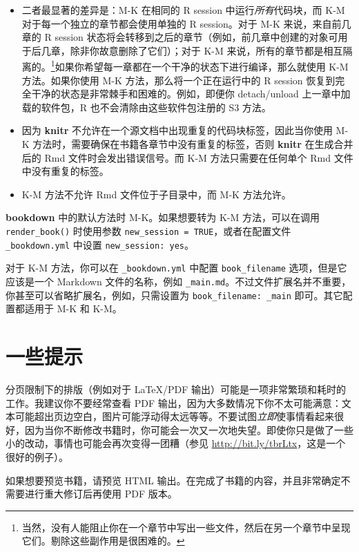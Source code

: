 \documentclass[
  12pt,
]{krantz}
\providecommand{\tightlist}{%
  \setlength{\itemsep}{0pt}\setlength{\parskip}{0pt}}
\theoremstyle{definition}
\theoremstyle{definition}
\theoremstyle{definition}
\theoremstyle{definition}
\theoremstyle{remark}
\begin{document}
\begin{itemize}
\tightlist
\item
  二者最显著的差异是：M-K 在相同的 R session 中运行\emph{所有}代码块，而 K-M 对于每一个独立的章节都会使用单独的 R session。对于 M-K 来说，来自前几章的 R session 状态将会转移到之后的章节（例如，前几章中创建的对象可用于后几章，除非你故意删除了它们）；对于 K-M 来说，所有的章节都是相互隔离的。\footnote{当然，没有人能阻止你在一个章节中写出一些文件，然后在另一个章节中呈现它们。剔除这些副作用是很困难的。}如果你希望每一章都在一个干净的状态下进行编译，那么就使用 K-M 方法。如果你使用 M-K 方法，那么将一个正在运行中的 R session 恢复到完全干净的状态是非常棘手和困难的。例如，即便你 detach/unload 上一章中加载的软件包，R 也不会清除由这些软件包注册的 S3 方法。
\item
  因为 \textbf{knitr} 不允许在一个源文档中出现重复的代码块标签，因此当你使用 M-K 方法时，需要确保在书籍各章节中没有重复的标签，否则 \textbf{knitr} 在生成合并后的 Rmd 文件时会发出错误信号。而 K-M 方法只需要在任何单个 Rmd 文件中没有重复的标签。
\item
  K-M 方法不允许 Rmd 文件位于子目录中，而 M-K 方法允许。
\end{itemize}

\textbf{bookdown} 中的默认方法时 M-K。如果想要转为 K-M 方法，可以在调用 \texttt{render\_book()} 时使用参数 \texttt{new\_session\ =\ TRUE}，或者在配置文件 \texttt{\_bookdown.yml} 中设置 \texttt{new\_session:\ yes}。

对于 K-M 方法，你可以在 \texttt{\_bookdown.yml} 中配置 \texttt{book\_filename} 选项，但是它应该是一个 Markdown 文件的名称，例如 \texttt{\_main.md}。不过文件扩展名并不重要，你甚至可以省略扩展名，例如，只需设置为 \texttt{book\_filename:\ \_main} 即可。其它配置都适用于 M-K 和 K-M。

\section{一些提示}\label{ux4e00ux4e9bux63d0ux793a}

分页限制下的排版（例如对于 LaTeX/PDF 输出）可能是一项非常繁琐和耗时的工作。我建议你不要经常查看 PDF 输出，因为大多数情况下你不太可能满意：文本可能超出页边空白，图片可能浮动得太远等等。不要试图\emph{立即}使事情看起来很好，因为当你不断修改书籍时，你可能会一次又一次地失望。即使你只是做了一些小的改动，事情也可能会再次变得一团糟（参见 \url{http://bit.ly/tbrLtx}，这是一个很好的例子）。

如果想要预览书籍，请预览 HTML 输出。在完成了书籍的内容，并且非常确定不需要进行重大修订后再使用 PDF 版本。
\end{document}
